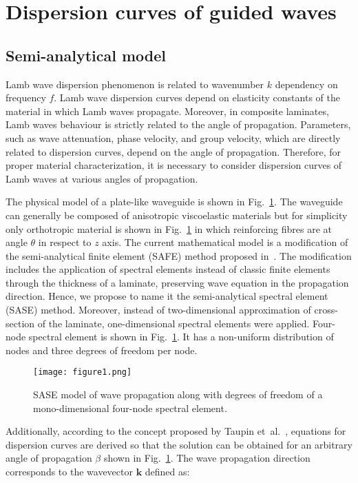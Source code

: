 \documentclass[preprint,12pt]{elsarticle}
\newcommand{\vect}[1]{\mathbf{#1}} %
\begin{document}
	
	\section{Dispersion curves of guided waves \label{sec:dispersion_curves}}
	\subsection{Semi-analytical model}
	Lamb wave dispersion phenomenon is related to wavenumber  $k$ dependency on frequency $f$. Lamb wave dispersion curves depend on elasticity constants of the material in which Lamb waves propagate. Moreover, in composite laminates, Lamb waves behaviour is strictly related to the angle of propagation. Parameters, such as wave attenuation, phase velocity, and group velocity, which are directly related to dispersion curves, depend on the angle of propagation. Therefore, for proper material characterization, it is necessary to consider dispersion curves of Lamb waves at various angles of propagation.

	The physical model of a plate-like waveguide is shown in Fig.~\ref{fig:layered_composite_SASE}.  The waveguide can generally be composed of anisotropic viscoelastic materials but for simplicity only orthotropic material is shown in Fig.~\ref{fig:layered_composite_SASE} in which reinforcing fibres are at angle $\theta$ in respect to $z$ axis. The current mathematical model is a modification of the semi-analytical finite element (SAFE) method proposed in~\cite{Bartoli2006}. The modification includes the application of spectral elements instead of classic finite elements through the thickness of a laminate, preserving wave equation in the propagation direction. Hence, we propose to name it the semi-analytical spectral element (SASE) method. Moreover, instead of two-dimensional approximation of cross-section of the laminate, one-dimensional spectral elements were applied. Four-node spectral element is shown in Fig.~\ref{fig:layered_composite_SASE}. It has a non-uniform distribution of nodes and three degrees of freedom per node.

		\begin{figure} [h!]
		\centering
		\texttt{[image: figure1.png]}
		\caption{SASE model of wave propagation along with degrees of freedom of a mono-dimensional four-node spectral element.}
		\label{fig:layered_composite_SASE}
	\end{figure}

	Additionally, according to the concept proposed by Taupin et~al.~\cite{Taupin2011}, equations for dispersion curves are derived so that the solution can be obtained for an arbitrary angle of propagation $\beta$ shown in Fig.~\ref{fig:layered_composite_SASE}. The wave propagation direction corresponds to the wavevector $\vect{k}$ defined as:
\end{document}
